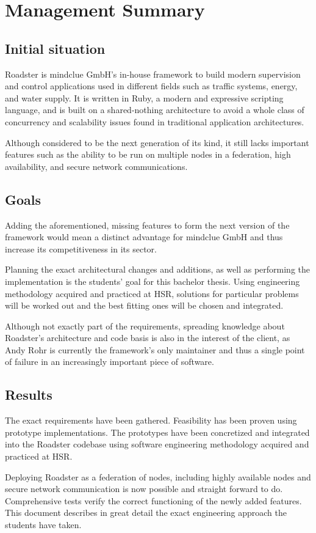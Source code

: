 \part{Management Summary}\label{part:mgmtsummary}
\chapter*{Initial situation}
Roadster is mindclue GmbH's in-house framework to build modern supervision and
control applications used in different fields such as traffic systems, energy,
and water supply. It is written in Ruby, a modern and expressive scripting
language, and is built on a shared-nothing architecture to avoid a whole class
of concurrency and scalability issues found in traditional application
architectures.

Although considered to be the next generation of its kind, it still lacks
important features such as the ability to be run on multiple
nodes in a federation, high availability, and secure network communications.

\chapter*{Goals}
Adding the aforementioned, missing features to form the next version of the
framework would mean a distinct advantage for mindclue GmbH and thus increase
its competitiveness in its sector.

Planning the exact architectural changes and additions, as well as performing
the implementation is the students' goal for this bachelor thesis. Using
engineering methodology acquired and practiced at HSR, solutions for particular problems
will be worked out and the best fitting ones will be chosen and integrated.

Although not exactly part of the requirements, spreading knowledge about Roadster's
architecture and code basis is also in the interest of the client, as Andy Rohr
is currently the framework's only maintainer and thus a single point of failure
in an increasingly important piece of software.

\chapter*{Results}
The exact requirements have been gathered. Feasibility has been proven using
prototype implementations. The prototypes have been concretized and integrated
into the Roadster codebase using software engineering methodology acquired and
practiced at HSR.

Deploying Roadster as a federation of nodes, including highly available nodes
and secure network communication is now possible and straight forward to do.
Comprehensive tests verify the correct functioning of the newly added features.
This document describes in great detail the exact engineering approach the
students have taken.
